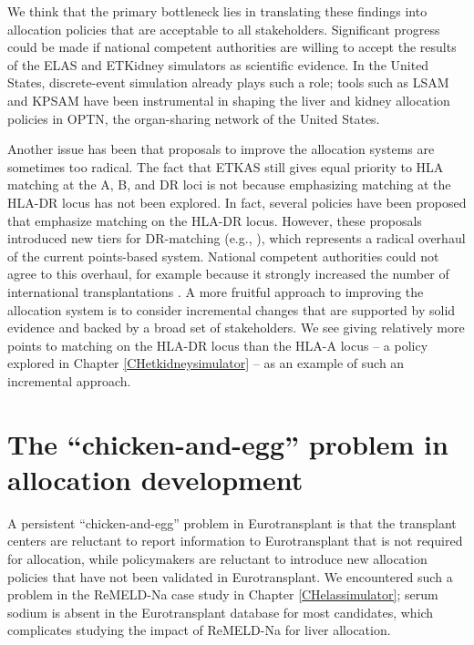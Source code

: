 \documentclass[11pt,twoside,]{book}
\begin{document}
\newpage
We think that the primary bottleneck lies in translating these findings into
allocation policies that are acceptable to all stakeholders. Significant
progress could be made if national competent authorities are willing to accept
the results of the ELAS and ETKidney simulators as scientific evidence. In the
United States, discrete-event simulation already plays such a role; tools
such as LSAM and KPSAM have been instrumental in shaping the liver and kidney
allocation policies in OPTN, the organ-sharing network of the United States.

Another issue has been that proposals to improve the allocation systems are
sometimes too radical. The fact that ETKAS still gives equal priority to
HLA matching at the A, B, and DR loci is not because emphasizing matching
at the HLA-DR locus has not been explored. In fact, several policies have
been proposed that emphasize matching on the HLA-DR locus. However, these proposals
introduced new tiers for DR-matching (e.g., \citep{doxiadisSimplerEquitableAllocation2007}),
which represents a radical overhaul of the current points-based system.
National competent authorities could not agree to this overhaul, for example
because it strongly increased the number of international transplantations \citep{heemskerkRegionalKidneyAllocation2009}. A more fruitful approach to
improving the allocation system is to consider incremental changes that are
supported by solid evidence and backed by a broad set of stakeholders.
We see giving relatively more points to matching on the HLA-DR locus than
the HLA-A locus -- a policy explored in Chapter \ref{CHetkidneysimulator} --
as an example of such an incremental approach.

\section{The ``chicken-and-egg'' problem in allocation development}\label{the-chicken-and-egg-problem-in-allocation-development}

A persistent ``chicken-and-egg'' problem in Eurotransplant is that the transplant
centers are reluctant to report information to Eurotransplant that is not required
for allocation, while policymakers are reluctant to introduce new allocation
policies that have not been validated in Eurotransplant. We encountered such
a problem in the ReMELD-Na case study in Chapter \ref{CHelassimulator}; serum sodium
is absent in the Eurotransplant database for most candidates, which complicates
studying the impact of ReMELD-Na for liver allocation.
\end{document}
